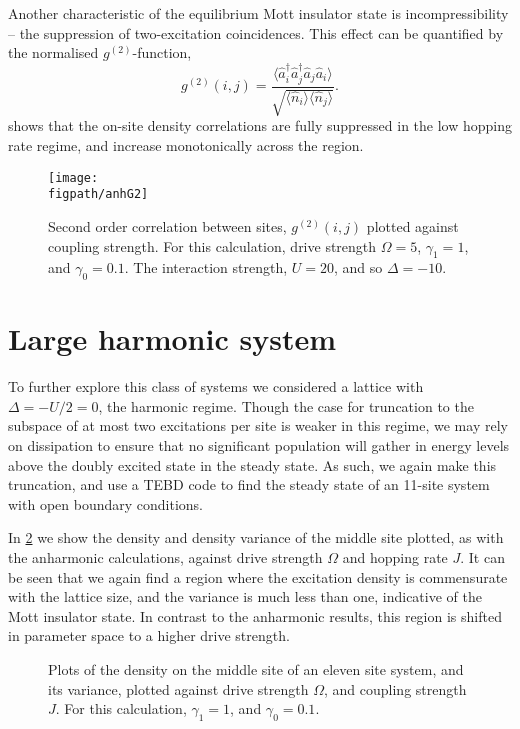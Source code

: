 Another characteristic of the equilibrium Mott insulator state is incompressibility -- the suppression of two-excitation coincidences. This effect can be quantified by the normalised \(g^{(2)}\)-function,
\begin{equation}
	g^{(2)}(i,j) = \frac{\langle \hat{a}_{i}^{\dagger}\hat{a}_{j}^{\dagger}\hat{a}_{j}\hat{a}_{i} \rangle}{\sqrt{\langle \hat{n}_{i} \rangle \langle \hat{n}_{j} \rangle}}.
	\label{eq:dnlca4-3}
\end{equation}
 shows that the on-site density correlations are fully suppressed in the low hopping rate regime, and increase monotonically across the region.

\begin{figure}[ht]
	\centering
	\texttt{[image: \\figpath/anhG2]}
	\caption{\label{fig:dnlca4-3} Second order correlation between sites, \(g^{(2)}(i,j)\) plotted against coupling strength. For this calculation, drive strength \(\Omega = 5\), \(\gamma_{1} = 1\), and \(\gamma_{0} = 0.1\). The interaction strength, \(U=20\), and so \(\Delta = -10\).}
\end{figure}

\section{Large harmonic system}

To further explore this class of systems we considered a lattice with \(\Delta = -U/2 = 0\), the harmonic regime. Though the case for truncation to the subspace of at most two excitations per site is weaker in this regime, we may rely on dissipation to ensure that no significant population will gather in energy levels above the doubly excited state in the steady state. As such, we again make this truncation, and use a TEBD code to find the steady state of an 11-site system with open boundary conditions.

In \cref{fig:dnlca5-1} we show the density and density variance of the middle site plotted, as with the anharmonic calculations, against drive strength \(\Omega\) and hopping rate \(J\). It can be seen that we again find a region where the excitation density is commensurate with the lattice size, and the variance is much less than one, indicative of the Mott insulator state. In contrast to the anharmonic results, this region is shifted in parameter space to a higher drive strength.

\begin{figure}[ht]
	 \hfill
	\caption{\label{fig:dnlca5-1} Plots of the density on the middle site of an eleven site system, and its variance, plotted against drive strength \(\Omega\), and coupling strength \(J\). For this calculation, \(\gamma_{1} = 1\), and \(\gamma_{0} = 0.1\).}
\end{figure}

